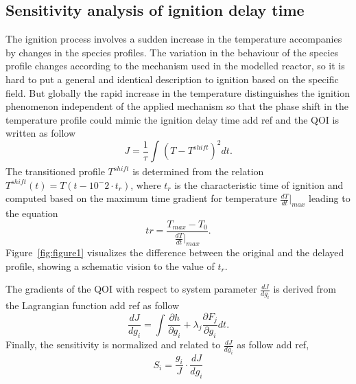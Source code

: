 \documentclass[preprint,review,12pt]{elsarticle}
\begin{document}
\subsection{Sensitivity analysis of ignition delay time}
\label{SensitivityAnalysis}
The ignition process involves a sudden increase in the temperature accompanies by changes in the species profiles. The variation in the behaviour of the species profile changes according to the mechanism used in the modelled reactor, so it is hard to put a general and identical description to ignition based on the specific field. But globally the rapid increase in the temperature distinguishes the ignition phenomenon independent of the applied mechanism so that the phase shift in the temperature profile could mimic the ignition delay time {\color{red} add ref} and the QOI is written as follow
\begin{equation}
J=\frac{1}{\tau}\int_{}^{} (T-T^{shift})^2dt.
\end{equation}
The transitioned profile $T^{shift}$  is determined from the relation $T^{shift}(t)=T(t-10^-2\cdot t_r)$, where $t_r$ is the characteristic time of ignition and computed based on the maximum time gradient for temperature $\frac{dT}{dt}\Big|_{max}$ leading to the equation
\begin{equation}
tr=\frac{T_{max}-T_0}{\frac{dT}{dt}\Big|_{max}}.
\end{equation} 
Figure~\ref{fig:figure1} visualizes the difference between the original and the delayed profile, showing a schematic vision to the value of $t_r$.  

The gradients of the QOI with respect to system parameter $\frac{d J}{dg_i}$ is derived from the Lagrangian function {\color{red} add ref}  as follow 
\begin{equation}
\frac{d J}{dg_i}= \int_{}^{} \frac{\partial h}{\partial g_i}+\lambda_j\frac{\partial F_j}{\partial g_i}dt.
\end{equation}
Finally, the sensitivity is normalized and related to $\frac{d J}{dg_i}$ as follow  {\color{red} add ref}, 
\begin{equation}
S_i=\frac{g_i}{J}\cdot\frac{d J}{dg_i}
\end{equation}   
\end{document}
